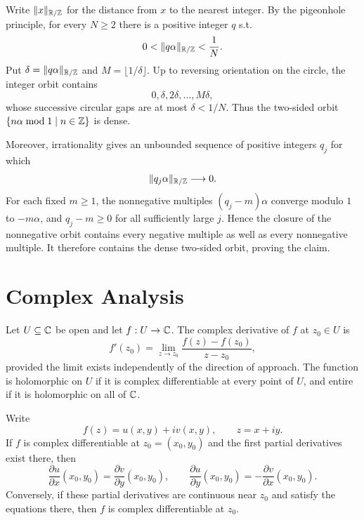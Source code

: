     \begin{idea}
        Write $\lVert x\rVert_{\mathbb{R}/\mathbb{Z}}$ for the distance from $x$ to the nearest
        integer. By the pigeonhole principle, for every $N\geq2$ there is a
        positive integer $q$ s.t.
        \[
            0<\lVert q\alpha\rVert_{\mathbb{R}/\mathbb{Z}}<\frac1N.
        \]
        Put $\delta=\lVert q\alpha\rVert_{\mathbb{R}/\mathbb{Z}}$ and
        $M=\lfloor1/\delta\rfloor$. Up to reversing orientation on the circle,
        the integer orbit contains
        \[
            0,\delta,2\delta,\dots,M\delta,
        \]
        whose successive circular gaps are at most $\delta<1/N$. Thus the
        two-sided orbit $\{n\alpha\bmod1\mid n\in\mathbb{Z}\}$ is dense.

        Moreover, irrationality gives an unbounded sequence of positive
        integers $q_j$ for which
        \[
            \lVert q_j\alpha\rVert_{\mathbb{R}/\mathbb{Z}}\longrightarrow0.
        \]
        For each fixed $m\geq1$, the nonnegative multiples
        $(q_j-m)\alpha$ converge modulo $1$ to $-m\alpha$, and $q_j-m\geq0$
        for all sufficiently large $j$. Hence the closure of the nonnegative
        orbit contains every negative multiple as well as every nonnegative
        multiple. It therefore contains the dense two-sided orbit, proving the
        claim.
    \end{idea}

    \section*{Complex Analysis}

    \begin{definition}
        Let $U\subseteq\mathbb{C}$ be open and let $f:U\to\mathbb{C}$. The complex derivative of
        $f$ at $z_0\in U$ is
        \[
            f'(z_0)
            =
            \lim\limits_{z\to z_0}
            \frac{f(z)-f(z_0)}{z-z_0},
        \]
        provided the limit exists independently of the direction of approach.
        The function is holomorphic on $U$ if it is complex differentiable at
        every point of $U$, and entire if it is holomorphic on all of $\mathbb{C}$.
    \end{definition}

    \begin{theorem}
        Write
        \[
            f(z)=u(x,y)+iv(x,y),
            \qquad
            z=x+iy.
        \]
        If $f$ is complex differentiable at $z_0=(x_0,y_0)$ and the first partial
        derivatives exist there, then
        \[
            \frac{\partial u}{\partial x}(x_0,y_0)
            =
            \frac{\partial v}{\partial y}(x_0,y_0),
            \qquad
            \frac{\partial u}{\partial y}(x_0,y_0)
            =
            -\frac{\partial v}{\partial x}(x_0,y_0).
        \]
        Conversely, if these partial derivatives are continuous near $z_0$ and
        satisfy the equations there, then $f$ is complex differentiable at
        $z_0$.
    \end{theorem}

